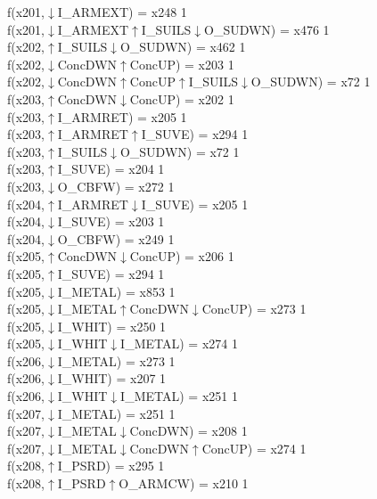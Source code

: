 f(x201,$\downarrow$I\_ARMEXT) = x248 {1} \\
f(x201,$\downarrow$I\_ARMEXT$\uparrow$I\_SUILS$\downarrow$O\_SUDWN) = x476 {1} \\
f(x202,$\uparrow$I\_SUILS$\downarrow$O\_SUDWN) = x462 {1} \\
f(x202,$\downarrow$ConcDWN$\uparrow$ConcUP) = x203 {1} \\
f(x202,$\downarrow$ConcDWN$\uparrow$ConcUP$\uparrow$I\_SUILS$\downarrow$O\_SUDWN) = x72 {1} \\
f(x203,$\uparrow$ConcDWN$\downarrow$ConcUP) = x202 {1} \\
f(x203,$\uparrow$I\_ARMRET) = x205 {1} \\
f(x203,$\uparrow$I\_ARMRET$\uparrow$I\_SUVE) = x294 {1} \\
f(x203,$\uparrow$I\_SUILS$\downarrow$O\_SUDWN) = x72 {1} \\
f(x203,$\uparrow$I\_SUVE) = x204 {1} \\
f(x203,$\downarrow$O\_CBFW) = x272 {1} \\
f(x204,$\uparrow$I\_ARMRET$\downarrow$I\_SUVE) = x205 {1} \\
f(x204,$\downarrow$I\_SUVE) = x203 {1} \\
f(x204,$\downarrow$O\_CBFW) = x249 {1} \\
f(x205,$\uparrow$ConcDWN$\downarrow$ConcUP) = x206 {1} \\
f(x205,$\uparrow$I\_SUVE) = x294 {1} \\
f(x205,$\downarrow$I\_METAL) = x853 {1} \\
f(x205,$\downarrow$I\_METAL$\uparrow$ConcDWN$\downarrow$ConcUP) = x273 {1} \\
f(x205,$\downarrow$I\_WHIT) = x250 {1} \\
f(x205,$\downarrow$I\_WHIT$\downarrow$I\_METAL) = x274 {1} \\
f(x206,$\downarrow$I\_METAL) = x273 {1} \\
f(x206,$\downarrow$I\_WHIT) = x207 {1} \\
f(x206,$\downarrow$I\_WHIT$\downarrow$I\_METAL) = x251 {1} \\
f(x207,$\downarrow$I\_METAL) = x251 {1} \\
f(x207,$\downarrow$I\_METAL$\downarrow$ConcDWN) = x208 {1} \\
f(x207,$\downarrow$I\_METAL$\downarrow$ConcDWN$\uparrow$ConcUP) = x274 {1} \\
f(x208,$\uparrow$I\_PSRD) = x295 {1} \\
f(x208,$\uparrow$I\_PSRD$\uparrow$O\_ARMCW) = x210 {1} \\
